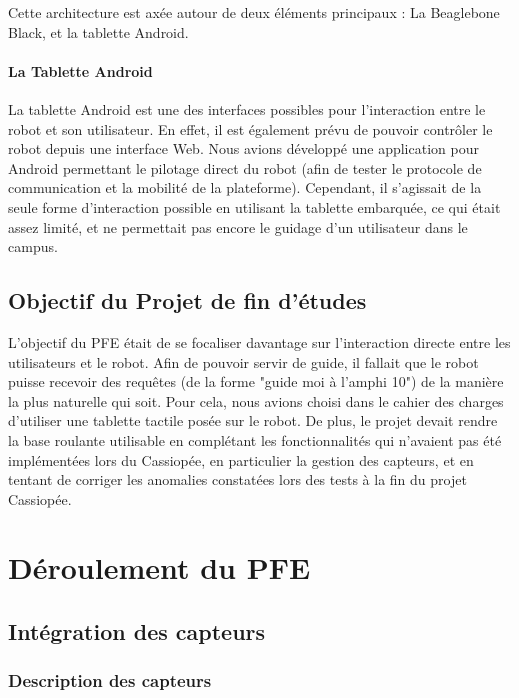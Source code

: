 \documentclass{report}
\begin{document}
    {Cette architecture est axée autour de deux éléments principaux :
    La Beaglebone Black, et la tablette Android.}

    \subsubsection{La Tablette Android}

    {La tablette Android est une des interfaces possibles pour l'interaction entre le robot
    et son utilisateur. En effet, il est également prévu de pouvoir contrôler le robot
    depuis une interface Web. Nous avions développé une application pour Android
    permettant le pilotage direct du robot (afin de tester le protocole de communication
    et la mobilité de la plateforme). Cependant, il s'agissait de la seule forme d'interaction
    possible en utilisant la tablette embarquée, ce qui était assez limité, et ne permettait
     pas encore le guidage d'un utilisateur dans le campus.}


    \section{Objectif du Projet de fin d'études}

    {L'objectif du PFE était de se focaliser davantage sur l'interaction directe
     entre les utilisateurs et le robot. Afin de pouvoir servir de guide, il
     fallait que le robot puisse recevoir des requêtes (de la forme "guide
     moi à l'amphi 10") de la manière la plus naturelle qui soit. Pour cela,
     nous avions choisi dans le cahier des charges d'utiliser une tablette
     tactile posée sur le robot. De plus, le projet devait rendre la base
     roulante utilisable en complétant les fonctionnalités qui n'avaient pas
     été implémentées lors du Cassiopée, en particulier la gestion des capteurs,
     et en tentant de corriger les anomalies constatées lors des tests à la fin
     du projet Cassiopée.}



  \chapter{Déroulement du PFE}

    \section{Intégration des capteurs}

        \subsection{Description des capteurs}
\end{document}

